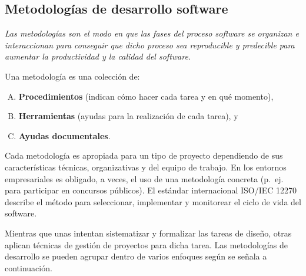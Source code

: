 \subsection{Metodologías de desarrollo software}
\emph{Las metodologías son el modo en que las fases del proceso software se organizan e interaccionan para conseguir que dicho proceso sea reproducible y predecible para aumentar la productividad y la calidad del software.}

Una metodología es una colección de:

\begin{enumerate}[A.]
\item \textbf{Procedimientos} (indican cómo hacer cada tarea y en qué momento),
\item \textbf{Herramientas} (ayudas para la realización de cada tarea), y
\item \textbf{Ayudas documentales}.
\end{enumerate}

Cada metodología es apropiada para un tipo de proyecto dependiendo de sus 
características técnicas, organizativas y del equipo de trabajo. En los 
entornos empresariales es obligado, a veces, el uso de una metodología 
concreta (p.~ej. para participar en concursos públicos). El estándar 
internacional ISO/IEC 12270 describe el método para 
seleccionar, implementar y monitorear el ciclo de vida del software.

Mientras que unas intentan sistematizar y formalizar las tareas de diseño, otras aplican técnicas de gestión de proyectos para dicha tarea. Las metodologías de desarrollo se pueden agrupar dentro de varios enfoques según se señala a continuación.

